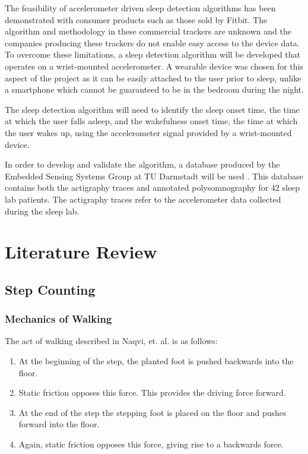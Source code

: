             The feasibility of accelerometer driven sleep detection algorithms has been demonstrated with consumer products such as those sold by Fitbit. The algorithm and methodology in these commercial trackers are unknown and the companies producing these trackers do not enable easy access to the device data. To overcome these limitations, a sleep detection algorithm will be developed that operates on a wrist-mounted accelerometer. A wearable device was chosen for this aspect of the project as it can be easily attached to the user prior to sleep, unlike a smartphone which cannot be guaranteed to be in the bedroom during the night.

            The sleep detection algorithm will need to identify the sleep onset time, the time at which the user falls asleep, and the wakefulness onset time, the time at which the user wakes up, using the accelerometer signal provided by a wrist-mounted device.

            In order to develop and validate the algorithm, a database produced by the Embedded Sensing Systems Group at TU Darmstadt will be used \cite{database}. This database contains both the actigraphy traces and annotated polysomnography for 42 sleep lab patients. The actigraphy traces refer to the accelerometer data collected during the sleep lab.


    \chapter{Literature Review}


        \section{Step Counting}

            \subsection{Mechanics of Walking}

                The act of walking described in Naqvi, et. al. \cite{navqi} is as follows:

                \begin{enumerate}
                    \item At the beginning of the step, the planted foot is pushed backwards into the floor.
                    \item Static friction opposes this force. This provides the driving force forward.
                    \item At the end of the step the stepping foot is placed on the floor and pushes forward into the floor.
                    \item Again, static friction opposes this force, giving rise to a backwards force.
                \end{enumerate}

